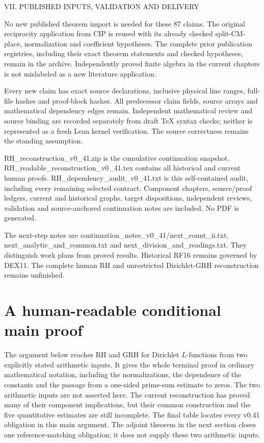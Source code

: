 \documentclass[11pt,a4paper]{article}
\numberwithin{equation}{section}
\theoremstyle{remark}\newtheorem{remark}[theorem]{Remark}
\begin{document}
VII. PUBLISHED INPUTS, VALIDATION AND DELIVERY

No new published theorem import is needed for these 87 claims. The original reciprocity application from CIP is reused with its already checked split-CM-place, normalization and coefficient hypotheses. The complete prior publication registries, including their exact theorem statements and checked hypotheses, remain in the archive. Independently proved finite algebra in the current chapters is not mislabeled as a new literature application.

Every new claim has exact source declarations, inclusive physical line ranges, full-file hashes and proof-block hashes. All predecessor claim fields, source arrays and mathematical dependency edges remain. Independent mathematical review and source binding are recorded separately from draft TeX syntax checks; neither is represented as a fresh Lean kernel verification. The source correctness remains the standing assumption.

RH\_\allowbreak{}reconstruction\_\allowbreak{}v0\_\allowbreak{}41.zip is the cumulative continuation snapshot. RH\_\allowbreak{}readable\_\allowbreak{}reconstruction\_\allowbreak{}v0\_\allowbreak{}41.tex contains all historical and current human proofs. RH\_\allowbreak{}dependency\_\allowbreak{}audit\_\allowbreak{}v0\_\allowbreak{}41.txt is this self-contained audit, including every remaining selected contract. Component chapters, source/\allowbreak{}proof ledgers, current and historical graphs, target dispositions, independent reviews, validation and source-anchored continuation notes are included. No PDF is generated.

The next-step notes are continuation\_\allowbreak{}notes\_\allowbreak{}v0\_\allowbreak{}41/\allowbreak{}next\_\allowbreak{}count\_\allowbreak{}ii.txt, next\_\allowbreak{}analytic\_\allowbreak{}and\_\allowbreak{}common.txt and next\_\allowbreak{}division\_\allowbreak{}and\_\allowbreak{}readings.txt. They distinguish work plans from proved results. Historical RF16 remains governed by DEX11. The complete human RH and unrestricted Dirichlet-GRH reconstruction remains unfinished.

\clearpage
\section{A human-readable conditional main proof}
\label{sec:conditional-main-v42}

The argument below reaches RH and GRH for Dirichlet $L$-functions
from two explicitly stated arithmetic inputs.  It gives the whole
terminal proof in ordinary mathematical notation, including the
normalizations, the dependence of the constants and the passage from
a one-sided prime-sum estimate to zeros.  The two arithmetic inputs
are not asserted here.  The current reconstruction has proved many
of their component implications, but their common construction and
the five quantitative estimates are still incomplete.  The final
table locates every v0.41 obligation in this main argument.  The
adjoint theorem in the next section closes one reference-matching
obligation; it does not supply these two arithmetic inputs.
\end{document}
